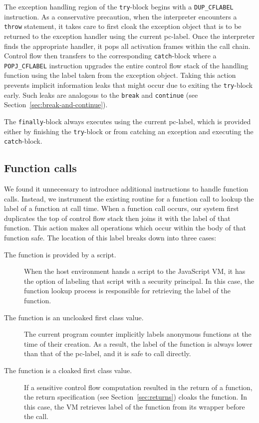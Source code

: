 The exception handling region of the \texttt{try}-block begins with a \texttt{DUP\_CFLABEL} instruction.
As a conservative precaution, when the interpreter encounters a \texttt{throw} statement, it takes care to first cloak the exception object that is to be returned to the exception handler using the current pc-label.
Once the interpreter finds the appropriate handler, it pops all activation frames within the call chain.
Control flow then transfers to the corresponding \texttt{catch}-block where a \texttt{POPJ\_CFLABEL} instruction upgrades the entire control flow stack of the handling function using the label taken from the exception object.
Taking this action prevents implicit information leaks that might occur due to exiting the \texttt{try}-block early.
Such leaks are analogous to the \texttt{break} and \texttt{continue} (see Section~\ref{sec:break-and-continue}).

The \texttt{finally}-block always executes using the current pc-label, which is provided either by finishing the \texttt{try}-block or from catching an exception and executing the \texttt{catch}-block.

\subsection{Function calls}
\label{sec:function-calls}
We found it unnecessary to introduce additional instructions to handle function calls.
Instead, we instrument the existing routine for a function call to lookup the label of a function at call time.
When a function call occurs, our system first duplicates the top of control flow stack then joins it with the label of that function.
This action makes all operations which occur within the body of that function safe.
The location of this label breaks down into three cases:
\begin{description}
 \item [The function is provided by a script.]
  When the host environment hands a script to the JavaScript VM, it has the option of labeling that script with a security principal.
  In this case, the function lookup process is responsible for retrieving the label of the function.
 \item [The function is an uncloaked first class value.]
  The current program counter implicitly labels anonymous functions at the time of their creation.
  As a result, the label of the function is always lower than that of the pc-label, and it is safe to call directly.
 \item [The function is a cloaked first class value.]
  If a sensitive control flow computation resulted in the return of a function, the return specification (see Section~\ref{sec:returns}) cloaks the function.
  In this case, the VM retrieves label of the function from its wrapper before the call.
\end{description}

